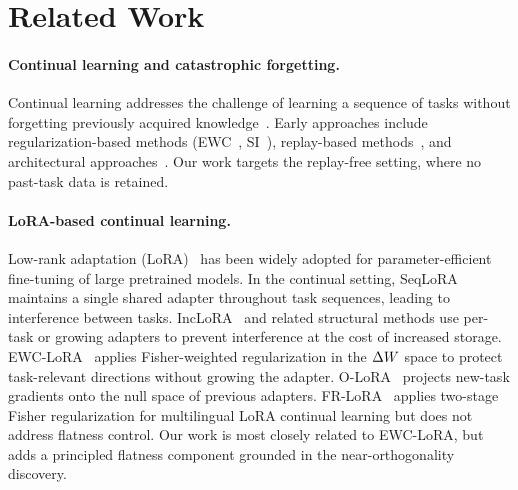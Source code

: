 \section{Related Work}
\label{sec:related}

\paragraph{Continual learning and catastrophic forgetting.}
Continual learning addresses the challenge of learning a sequence of tasks without
forgetting previously acquired knowledge~\citep{McCloskey1989,FrenchCF1999,Parisi2019}.
Early approaches include regularization-based methods (EWC~\citep{EWC2017}, SI~\citep{zenke2017continual}),
replay-based methods~\citep{Rebuffi2017iCaRL,Lopez-Paz2017GEM}, and
architectural approaches~\citep{Rusu2016,HAT2018}.
Our work targets the replay-free setting, where no past-task data is retained.

\paragraph{LoRA-based continual learning.}
Low-rank adaptation (LoRA)~\citep{hu2022lora} has been widely adopted for
parameter-efficient fine-tuning of large pretrained models.
In the continual setting, SeqLoRA maintains a single shared adapter throughout task sequences,
leading to interference between tasks.
IncLoRA~\citep{Wang_2022_CVPR} and related structural methods use per-task or
growing adapters to prevent interference at the cost of increased storage.
EWC-LoRA~\citep{zheng2025ewclora} applies Fisher-weighted regularization in the $\Delta W$ space
to protect task-relevant directions without growing the adapter.
O-LoRA~\citep{Wang2023OLoRA} projects new-task gradients onto the null space of
previous adapters.
FR-LoRA~\citep{adhikari2025frlora} applies two-stage Fisher regularization for
multilingual LoRA continual learning but does not address flatness control.
Our work is most closely related to EWC-LoRA, but adds a principled flatness component
grounded in the near-orthogonality discovery.

